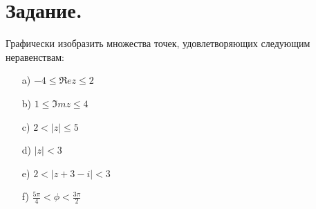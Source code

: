 \documentclass[12pt, a4paper]{article}
\begin{document}
\section{Задание.}
    Графически изобразить множества точек, удовлетворяющих следующим неравенствам:
    \begin{enumerate}
        \item [a)] $-4 \leq \Re ez \leq 2$
        \item [b)] $1 \leq \Im mz \leq 4$
        \item [c)] $2 < |z| \leq 5$
        \item [d)] $|z| < 3$
        \item [e)] $2 < |z + 3 - i| < 3$
        \item [f)] $\frac{5\pi}{4} < \phi < \frac{3\pi}{2}$
    \end{enumerate}\newpage
\end{document}
